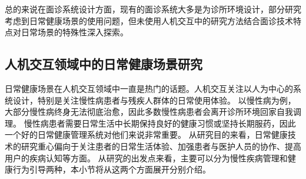 

总的来说在面诊系统设计方面，现有的面诊系统大多是为诊所环境设计，部分研究考虑到日常健康场景的使用问题，但未使用人机交互中的研究方法结合面诊技术特点对日常场景的特殊性深入探索。

\subsection{人机交互领域中的日常健康场景研究}
\label{subsec:daily-health}

日常健康场景在人机交互领域中一直是热门的话题。人机交互关注以人为中心的系统设计，特别是关注慢性病患者与残疾人群体的日常使用体验。
以慢性病为例，大部分慢性病终身无法彻底治愈，因此多数慢性病患者会离开诊所环境回家自我调理。
慢性病患者需要日常生活中长期保持良好的健康习惯或坚持长期服药，因此一个好的日常健康管理系统对他们来说非常重要。
从研究目的来看，日常健康技术的研究重心偏向于关注患者的日常生活体验、加强患者与医护人员的协作、提高用户的疾病认知等方面\cite{nunes2015self-care}。
从研究的出发点来看，主要可以分为慢性疾病管理和健康行为引导两种\cite{nunes2015self-care}，本小节将从这两个方面展开分别介绍。

